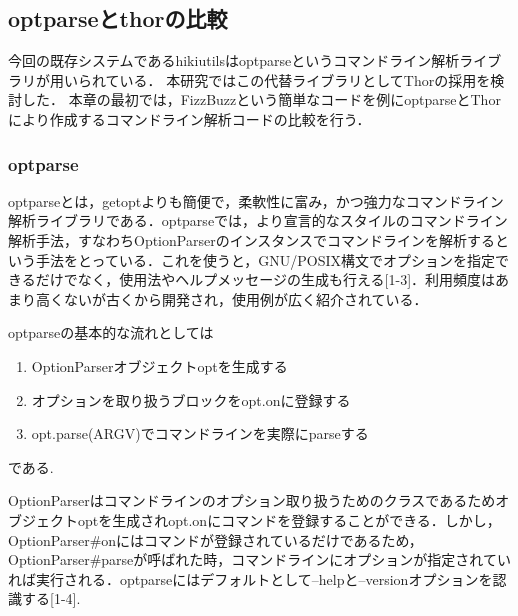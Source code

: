
\subsection{optparseとthorの比較}
今回の既存システムであるhikiutilsはoptparseというコマンドライン解析ライブラリが用いられている．
本研究ではこの代替ライブラリとしてThorの採用を検討した．
本章の最初では，FizzBuzzという簡単なコードを例にoptparseとThorにより作成するコマンドライン解析コードの比較を行う．

\subsubsection{optparse}
optparseとは，getoptよりも簡便で，柔軟性に富み，かつ強力なコマンドライン解析ライブラリである．optparseでは，より宣言的なスタイルのコマンドライン解析手法，すなわちOptionParserのインスタンスでコマンドラインを解析するという手法をとっている．これを使うと，GNU/POSIX構文でオプションを指定できるだけでなく，使用法やヘルプメッセージの生成も行える[1-3]．利用頻度はあまり高くないが古くから開発され，使用例が広く紹介されている．

optparseの基本的な流れとしては

\begin{enumerate}
\item OptionParserオブジェクトoptを生成する
\item オプションを取り扱うブロックをopt.onに登録する
\item opt.parse(ARGV)でコマンドラインを実際にparseする
\end{enumerate}
である.

OptionParserはコマンドラインのオプション取り扱うためのクラスであるためオブジェクトoptを生成されopt.onにコマンドを登録することができる．しかし，OptionParser\#onにはコマンドが登録されているだけであるため，OptionParser\#parseが呼ばれた時，コマンドラインにオプションが指定されていれば実行される．optparseにはデフォルトとして--helpと--versionオプションを認識する[1-4].

